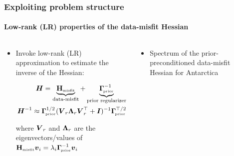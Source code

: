 \documentclass[10pt,final,xcolor=dvipsnames,aspect ratio=169]{beamer}
\begin{document}
\begin{frame}[t]
	\frametitle{Exploiting problem structure}
	\framesubtitle{Low-rank (LR) properties of the data-misfit Hessian}
	\begin{columns}
		\begin{column}{0.49\paperwidth}
			\begin{itemize}
				\item<1-> Invoke low-rank (LR) approximation to estimate the inverse of the Hessian:
				\begin{minipage}{0.9\textwidth}
					\begin{block}{}
						\vspace{-0.4cm} 
						\begin{align*} 
						\boldsymbol{H} = \underbrace{\mathbf{{H}}_{\mbox{\tiny misfit}}}_{\text{data-misfit}} + \underbrace{\boldsymbol{\Gamma}_{\!\mbox{\tiny prior}}^{-1}}_{\text{prior regularizer}} \\
						\boldsymbol{H}^{-1} \approx \boldsymbol{\Gamma}_{\!\mbox{\tiny prior}}^{1/2} (\boldsymbol{V}_r \boldsymbol{\Lambda}_r \boldsymbol{V}^{\top}_r + \boldsymbol{I})^{-1}
						\boldsymbol{\Gamma}_{\!\mbox{\tiny prior}}^{\top/2} 
						\end{align*}
					\end{block}
				\end{minipage}
				
				\vspace{0.1in}
				where $\boldsymbol{V}_r$ and $\boldsymbol{\Lambda}_r$ are the eigenvectors/values of
				$\mathbf{{H}}_{\mbox{\tiny misfit}} \boldsymbol{v}_i = \lambda_i \boldsymbol{\Gamma}_{\!\mbox{\tiny prior}}^{-1} \boldsymbol{v}_i $
			\end{itemize} 
		\end{column}
		\begin{column}{0.49\paperwidth}
			\begin{itemize}
				\item<2-> Spectrum of the prior-preconditioned data-misfit Hessian for Antarctica 
				

\end{itemize}
\end{column}
\end{columns}
\end{frame}
\end{document}

